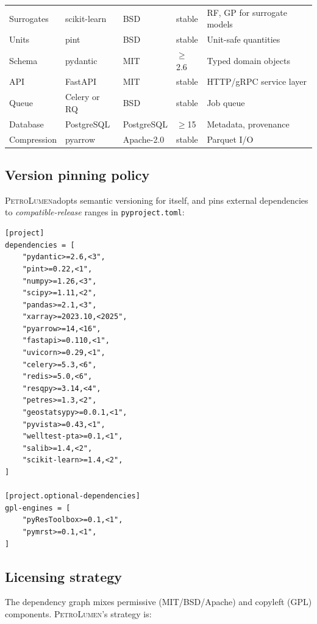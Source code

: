 \documentclass[11pt,a4paper]{article}
\newcommand{\petro}{\textsc{PetroLumen}}
\newcommand{\code}[1]{\texttt{#1}}
\begin{document}
\begin{longtable}{@{}p{2.4cm}p{2.9cm}p{1.9cm}p{1.7cm}p{4.5cm}@{}}
Surrogates          & scikit-learn    & BSD         & stable        & RF, GP for surrogate models\\
Units               & pint            & BSD         & stable        & Unit-safe quantities\\
Schema              & pydantic        & MIT         & $\geq$2.6     & Typed domain objects\\
API                 & FastAPI         & MIT         & stable        & HTTP/gRPC service layer\\
Queue               & Celery or RQ    & BSD         & stable        & Job queue\\
Database            & PostgreSQL      & PostgreSQL  & $\geq$15      & Metadata, provenance\\
Compression         & pyarrow         & Apache-2.0  & stable        & Parquet I/O\\
\bottomrule
\end{longtable}

\subsection{Version pinning policy}
\petro adopts semantic versioning for itself, and pins external dependencies to
\emph{compatible-release} ranges in \code{pyproject.toml}:
\begin{lstlisting}[style=txt, caption={Excerpt of pyproject.toml dependency pinning.}]
[project]
dependencies = [
    "pydantic>=2.6,<3",
    "pint>=0.22,<1",
    "numpy>=1.26,<3",
    "scipy>=1.11,<2",
    "pandas>=2.1,<3",
    "xarray>=2023.10,<2025",
    "pyarrow>=14,<16",
    "fastapi>=0.110,<1",
    "uvicorn>=0.29,<1",
    "celery>=5.3,<6",
    "redis>=5.0,<6",
    "resqpy>=3.14,<4",
    "petres>=1.3,<2",
    "geostatsypy>=0.0.1,<1",
    "pyvista>=0.43,<1",
    "welltest-pta>=0.1,<1",
    "salib>=1.4,<2",
    "scikit-learn>=1.4,<2",
]

[project.optional-dependencies]
gpl-engines = [
    "pyResToolbox>=0.1,<1",
    "pymrst>=0.1,<1",
]
\end{lstlisting}

\subsection{Licensing strategy}

The dependency graph mixes permissive (MIT/BSD/Apache) and copyleft (GPL)
components. \petro's strategy is:
\end{document}
